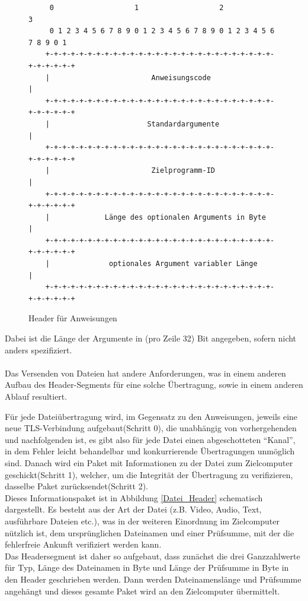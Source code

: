 \begin{figure}[h] 
\begin{lstlisting}
     0                   1                   2                   3
     0 1 2 3 4 5 6 7 8 9 0 1 2 3 4 5 6 7 8 9 0 1 2 3 4 5 6 7 8 9 0 1
    +-+-+-+-+-+-+-+-+-+-+-+-+-+-+-+-+-+-+-+-+-+-+-+-+-+-+-+-+-+-+-+-+
    |                        Anweisungscode                         |
    +-+-+-+-+-+-+-+-+-+-+-+-+-+-+-+-+-+-+-+-+-+-+-+-+-+-+-+-+-+-+-+-+
    |                       Standardargumente                       |
    +-+-+-+-+-+-+-+-+-+-+-+-+-+-+-+-+-+-+-+-+-+-+-+-+-+-+-+-+-+-+-+-+
    |                        Zielprogramm-ID                        |
    +-+-+-+-+-+-+-+-+-+-+-+-+-+-+-+-+-+-+-+-+-+-+-+-+-+-+-+-+-+-+-+-+
    |             Länge des optionalen Arguments in Byte            |
    +-+-+-+-+-+-+-+-+-+-+-+-+-+-+-+-+-+-+-+-+-+-+-+-+-+-+-+-+-+-+-+-+
    |              optionales Argument variabler Länge              |
    +-+-+-+-+-+-+-+-+-+-+-+-+-+-+-+-+-+-+-+-+-+-+-+-+-+-+-+-+-+-+-+-+
\end{lstlisting}
\caption{Header für Anweisungen}
\label{Anweisungs_Header}
\end{figure}

Dabei ist die Länge der Argumente in (pro Zeile 32) Bit angegeben, sofern nicht anders spezifiziert.\\\\
Das Versenden von Dateien hat andere Anforderungen, was in einem anderen Aufbau des Header-Segments für eine solche Übertragung, sowie in einem anderen Ablauf resultiert.\par
Für jede Dateiübertragung wird, im Gegensatz zu den Anweisungen, jeweils eine neue TLS-Verbindung aufgebaut(Schritt 0), die unabhängig von vorhergehenden und nachfolgenden ist, es gibt also für jede Datei einen abgeschotteten "`Kanal"', in dem Fehler leicht behandelbar und konkurrierende Übertragungen unmöglich sind.
Danach wird ein Paket mit Informationen zu der Datei zum Zielcomputer geschickt(Schritt 1), welcher, um die Integrität der Übertragung zu verifizieren, dasselbe Paket zurücksendet(Schritt 2).\\
Dieses Informationspaket ist in Abbildung \ref{Datei_Header} schematisch dargestellt.
Es besteht aus der Art der Datei (z.B. Video, Audio, Text, ausführbare Dateien etc.), was in der weiteren Einordnung im Zielcomputer nützlich ist, dem ursprünglichen Dateinamen und einer Prüfsumme, mit der die fehlerfreie Ankunft verifiziert werden kann.\\
Das Headersegment ist daher so aufgebaut, dass zunächst die drei Ganzzahlwerte für Typ, Länge des Dateinamen in Byte und Länge der Prüfsumme in Byte in den Header geschrieben werden. Dann werden Dateinamenslänge und Prüfsumme angehängt und dieses gesamte Paket wird an den Zielcomputer übermittelt.\par

